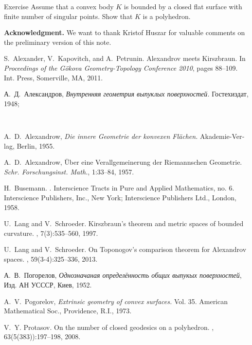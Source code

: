 \documentclass[oneside,a4paper, 12pt]{article}
\begin{document}
\begin{thm}{Exercise}
Assume that a convex body $K$ is bounded by a closed flat surface with finite number of singular points.
Show that $K$ is a polyhedron.
\end{thm}


\bigskip
\textbf{Acknowledgment.}
We want to thank Kristof Huszar for valuable comments on the preliminary version of this note. 




\begin{thebibliography}{52}

S.~Alexander, V.~Kapovitch, and A.~Petrunin.
\newblock Alexandrov meets {K}irszbraun.
\newblock In {\em Proceedings of the {G}\"okova {G}eometry-{T}opology
  {C}onference 2010}, pages 88--109. Int. Press, Somerville, MA, 2011.

\begin{otherlanguage}{russian}
А.~Д.~Александров,
\emph{Внутренняя геометрия выпуклых поверхностей.} 
Гостехиздат, 1948;
\end{otherlanguage}\\
\begin{otherlanguage}{german}
A.~D.~Alexandrow, \emph{Die innere Geometrie der konvexen Fl\"achen.} 
Akademie-Verlag, Berlin, 1955.
\end{otherlanguage}

A.~D.~Alexandrow,
\"Uber eine Verallgemeinerung der Riemannschen Geometrie.
\emph{Schr. Forschungsinst. Math.},
1:33--84, 1957.

H.~Busemann.
.
\newblock Interscience Tracts in Pure and Applied Mathematics, no. 6.
  Interscience Publishers, Inc., New York; Interscience Publishers Ltd.,
  London, 1958.

U.~Lang and V.~Schroeder.
\newblock Kirszbraun's theorem and metric spaces of bounded curvature.
, 7(3):535--560, 1997.

U.~Lang and V.~Schroeder.
\newblock On {T}oponogov's comparison theorem for {A}lexandrov spaces.
, 59(3-4):325--336, 2013.

\begin{otherlanguage}{russian}
А.~В.~Погорелов,
\emph{Однозначаная определённость общих выпукых поверхностей},
Изд. АН УСССР, Киев, 1952.
\end{otherlanguage}

A.~V.~Pogorelov, \emph{Extrinsic geometry of convex surfaces.} Vol. 35. American Mathematical Soc., Providence, R.I., 1973.

V.~Y. Protasov.
\newblock On the number of closed geodesics on a polyhedron.
, 63(5(383)):197--198, 2008.

\end{thebibliography}
\Addresses
\end{document}
